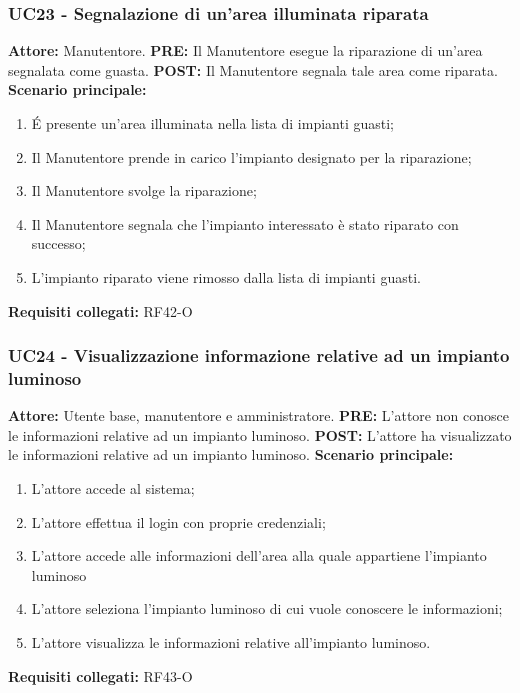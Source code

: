 \documentclass[a4paper, 12pt]{article}
\begin{document}
\subsubsection{UC23 - Segnalazione di un'area illuminata riparata}
\textbf{Attore:} Manutentore.\newline
\textbf{PRE:} Il Manutentore esegue la riparazione di un'area segnalata come guasta.\newline
\textbf{POST:} Il Manutentore segnala tale area come riparata. \newline
\textbf{Scenario principale:}
\begin{enumerate}
    \item \'E presente un'area illuminata nella lista di impianti guasti;
    \item Il Manutentore prende in carico l'impianto designato per la riparazione;
    \item Il Manutentore svolge la riparazione;
    \item Il Manutentore segnala che l'impianto interessato è stato riparato con successo;
    \item L'impianto riparato viene rimosso dalla lista di impianti guasti.
\end{enumerate}
\textbf{Requisiti collegati:} RF42-O\newline

\subsubsection{UC24 - Visualizzazione informazione relative ad un impianto luminoso}
\textbf{Attore: } Utente base, manutentore e amministratore.\newline
\textbf{PRE: } L'attore non conosce le informazioni relative ad un impianto luminoso.\newline
\textbf{POST: } L'attore ha visualizzato le informazioni relative ad un impianto luminoso.\newline
\textbf{Scenario principale: }
\begin{enumerate}
    \item L'attore accede al sistema;
    \item L'attore effettua il login con proprie credenziali;
    \item L'attore accede alle informazioni dell'area alla quale appartiene l'impianto luminoso
    \item L'attore seleziona l'impianto luminoso di cui vuole conoscere le informazioni;
    \item L'attore visualizza le informazioni relative all'impianto luminoso.
\end{enumerate}
\textbf{Requisiti collegati: } RF43-O\newline
\end{document}

